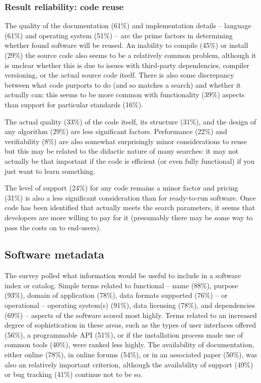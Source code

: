 \documentclass{casicswhitepaper}
\begin{document}
\subsubsection{Result reliability: code reuse}

The quality of the documentation (61\%) and implementation details -- language (61\%) and operating system (51\%) -- are the prime factors in determining whether found software will be reused. An inability to compile (45\%) or install (29\%) the source code also seems to be a relatively common problem, although it is unclear whether this is due to issues with third-party dependencies, compiler versioning, or the actual source code itself. There is also some discrepancy between what code purports to do (and so matches a search) and whether it actually can: this seems to be more common with functionality (39\%) aspects than support for particular standards (16\%). 

The actual quality (33\%) of the code itself, its structure (31\%), and the design of any algorithm (29\%) are less significant factors. Performance (22\%) and verifiability (8\%) are also somewhat surprisingly minor considerations to reuse but this may be related to the didactic nature of many searches: it may not actually be that important if the code is efficient (or even fully functional) if you just want to learn something.

The level of support (24\%) for any code remains a minor factor and pricing (31\%) is also a less significant consideration than for ready-to-run software. Once code has been identified that actually meets the search parameters, it seems that developers are more willing to pay for it (presumably there may be some way to pass the costs on to end-users).

\subsection{Software metadata}

The survey polled what information would be useful to include in a software index or catalog. Simple terms related to functional -- name (88\%), purpose (93\%), domain of application (78\%), data formats supported (76\%) -- or operational -- operating system(s) (91\%), data licensing (78\%), and dependencies (69\%) -- aspects of the software scored most highly. Terms related to an increased degree of sophistication in these areas, such as the types of user interfaces offered (56\%), a programmable API (51\%), or if the installation process made use of common tools (40\%), were ranked less highly. 
The availability of documentation, either online (78\%), in online forums (54\%), or in an associated paper (50\%), was also an relatively important criterion, although the availability of support (49\%) or bug tracking (41\%) continue not to be so. 
\end{document}
